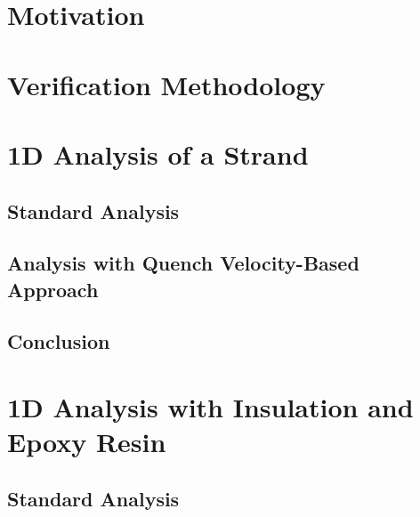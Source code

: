 \documentclass[11pt,a4paper]{report}
\begin{document}
\section{Motivation}


\section{Verification Methodology}
\label{section:quench_velocity_benchmarking_benchmarking_methodology}


\section{1D Analysis of a Strand}
\label{section:quench_velocity_benchmarking_no_insulation}

\subsection{Standard Analysis}
\label{section:quench_velocity_benchmarking_no_insulation_heat_balance}


\subsection{Analysis with Quench Velocity-Based Approach}
\label{section:quench_velocity_benchmarking_no_insulation_quench_velocity}


\subsection{Conclusion}


\section{1D Analysis with Insulation and Epoxy Resin}
\label{section:quench_velocity_benchmarking_with_insulation}

\subsection{Standard Analysis}
\label{section:quench_velocity_benchmarking_with_insulation_heat_balance}

\end{document}
